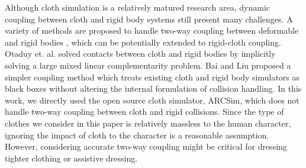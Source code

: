 
Although cloth simulation is a relatively matured research area, dynamic coupling between cloth and rigid body systems still present many challenges. A variety of methods are proposed to handle two-way coupling between deformable and rigid bodies \cite{Jansson and Vergeest 2003; Sifakis et al. 2007; Shinar et al. 2008; Otaduy et al. 2009; Miguel and Otaduy 2011}, which can be potentially extended to rigid-cloth coupling. Otaduy et. al. \cite{Otaduy et al. 2009} solved contacts between cloth and rigid bodies by implicitly solving a large mixed linear complementarity problem. Bai and Liu \cite{} proposed a simpler coupling method which treats existing cloth and rigid body simulators as black boxes without altering the internal formulation of collision handling. In this work, we directly used the open source cloth simulator, ARCSim\cite{}, which does not handle two-way coupling between cloth and rigid collisions. Since the type of clothes we consider in this paper is relatively massless to the human character, ignoring the impact of cloth to the character is a reasonable assumption. However, considering accurate two-way coupling might be critical for dressing tighter clothing or assistive dressing.

